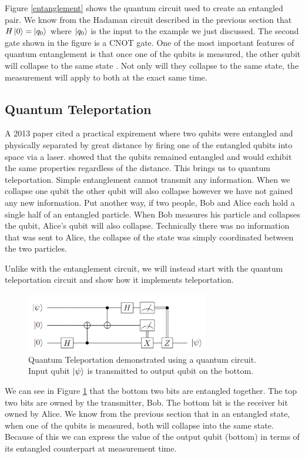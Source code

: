 \documentclass[conference]{IEEEtran}
\begin{document}
Figure \ref{entanglement} shows the quantum circuit used to create an entangled pair. We know from the Hadaman circuit described in the previous section that $H\ket{0} = \ket{q_0}$ where $\ket{q_0}$ is the input to the example we just discussed. The second gate shown in the figure is a CNOT gate. One of the most important features of quantum entanglement is that once one of the qubits is measured, the other qubit will collapse to the same state \cite{b8}. Not only will they collapse to the same state, the measurement will apply to both at the exact same time.

\subsection{Quantum Teleportation}

A 2013 paper \cite{b7} cited a practical expirement where two qubits were entangled and physically separated by great distance by firing one of the entangled qubits into space via a laser. \cite{b7} showed that the qubits remained entangled and would exhibit the same properties regardless of the distance. This brings us to quantum teleportation. Simple entanglement cannot transmit any information. When we collapse one qubit the other qubit will also collapse however we have not gained any new information. Put another way, if two people, Bob and Alice each hold a single half of an entangled particle. When Bob measures his particle and collapses the qubit, Alice's qubit will also collapse. Technically there was no information that was sent to Alice, the collapse of the state was simply coordinated between the two particles.

Unlike with the entanglement circuit, we will instead start with the quantum teleportation circuit and show how it implements teleportation.

\begin{figure}[htbp]
\centerline{\includegraphics[width=8cm]{teleportation_circuit.png}}
\caption{Quantum Teleportation demonstrated using a quantum circuit. Input qubit $\ket{\psi}$ is transmitted to output qubit on the bottom.}
\label{teleportion}
\end{figure}

We can see in Figure \ref{teleportion} that the bottom two bits are entangled together. The top two bits are owned by the transmitter, Bob. The bottom bit is the receiver bit owned by Alice. We know from the previous section that in an entangled state, when one of the qubits is measured, both will collapse into the same state. Because of this we can express the value of the output qubit (bottom) in terms of its entangled counterpart at measurement time.
\end{document}
